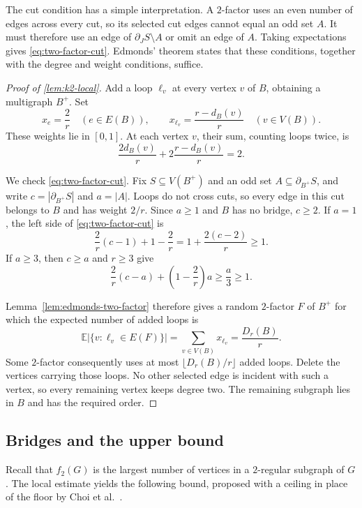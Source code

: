 \documentclass[11pt]{amsart}
\newtheorem{proposition}[theorem]{Proposition}
\theoremstyle{remark}
\newcommand{\E}{\mathbb E}
\begin{document}
The cut condition has a simple interpretation. A $2$-factor uses an even number of edges across every cut, so its selected cut edges cannot equal an odd set $A$. It must therefore use an edge of $\partial_J S\setminus A$ or omit an edge of $A$. Taking expectations gives \eqref{eq:two-factor-cut}. Edmonds' theorem states that these conditions, together with the degree and weight conditions, suffice.

\begin{proof}[Proof of \cref{lem:k2-local}]
Add a loop $\ell_v$ at every vertex $v$ of $B$, obtaining a multigraph $B^+$. Set
\[
x_e=\frac2r\quad(e\in E(B)),
\qquad
x_{\ell_v}=\frac{r-d_B(v)}r\quad(v\in V(B)).
\]
These weights lie in $[0,1]$. At each vertex $v$, their sum, counting loops twice, is
\[
\frac{2d_B(v)}r+2\frac{r-d_B(v)}r=2.
\]

We check \eqref{eq:two-factor-cut}. Fix $S\subseteq V(B^+)$ and an odd set $A\subseteq\partial_{B^+}S$, and write $c=|\partial_{B^+}S|$ and $a=|A|$. Loops do not cross cuts, so every edge in this cut belongs to $B$ and has weight $2/r$. Since $a\ge1$ and $B$ has no bridge, $c\ge2$. If $a=1$, the left side of \eqref{eq:two-factor-cut} is
\[
\frac2r(c-1)+1-\frac2r
=1+\frac{2(c-2)}r\ge1.
\]
If $a\ge3$, then $c\ge a$ and $r\ge3$ give
\[
\frac2r(c-a)+\left(1-\frac2r\right)a
\ge\frac a3\ge1.
\]

Lemma~\ref{lem:edmonds-two-factor} therefore gives a random $2$-factor $F$ of $B^+$ for which the expected number of added loops is
\[
\E\bigl|\{v:\ell_v\in E(F)\}\bigr|
=\sum_{v\in V(B)}x_{\ell_v}
=\frac{D_r(B)}r.
\]
Some $2$-factor consequently uses at most $\lfloor D_r(B)/r\rfloor$ added loops. Delete the vertices carrying those loops. No other selected edge is incident with such a vertex, so every remaining vertex keeps degree two. The remaining subgraph lies in $B$ and has the required order.
\end{proof}

\subsection{Bridges and the upper bound}

Recall that $f_2(G)$ is the largest number of vertices in a $2$-regular subgraph of $G$. The local estimate yields the following bound, proposed with a ceiling in place of the floor by Choi et al.~\cite[Section~1]{CKKPW2019}.

\end{document}
